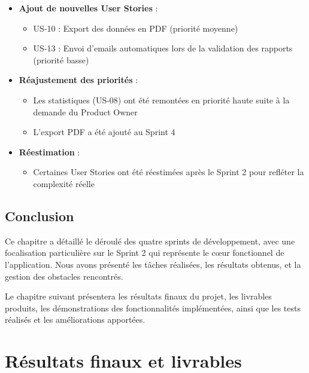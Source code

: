 \documentclass[12pt,a4paper]{report}
\begin{document}
\begin{itemize}[leftmargin=1cm]
    \item \textbf{Ajout de nouvelles User Stories} :
    \begin{itemize}
        \item US-10 : Export des données en PDF (priorité moyenne)
        \item US-13 : Envoi d'emails automatiques lors de la validation des rapports (priorité basse)
    \end{itemize}
    
    \item \textbf{Réajustement des priorités} :
    \begin{itemize}
        \item Les statistiques (US-08) ont été remontées en priorité haute suite à la demande du Product Owner
        \item L'export PDF a été ajouté au Sprint 4
    \end{itemize}
    
    \item \textbf{Réestimation} :
    \begin{itemize}
        \item Certaines User Stories ont été réestimées après le Sprint 2 pour refléter la complexité réelle
    \end{itemize}
\end{itemize}

\section*{Conclusion}

Ce chapitre a détaillé le déroulé des quatre sprints de développement, avec une focalisation particulière sur le Sprint 2 qui représente le cœur fonctionnel de l'application. Nous avons présenté les tâches réalisées, les résultats obtenus, et la gestion des obstacles rencontrés.

Le chapitre suivant présentera les résultats finaux du projet, les livrables produits, les démonstrations des fonctionnalités implémentées, ainsi que les tests réalisés et les améliorations apportées.


\chapter{Résultats finaux et livrables}
\end{document}
